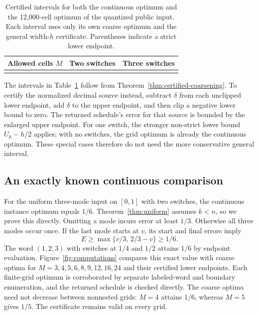 \begin{table}[tb]
\centering\small
\caption{Certified intervals for both the continuous optimum and the
12,000-cell optimum of the quantized public input. Each interval uses only its
own coarse optimum and the general width-$h$ certificate. Parentheses indicate
a strict lower endpoint.}
\label{tab:public-certificates}
\begin{tabular}{@{}rcc@{}}
\toprule
Allowed cells $M$ & Two switches & Three switches\\
\midrule
\\
\bottomrule
\end{tabular}
\end{table}

The intervals in Table~\ref{tab:public-certificates} follow from
Theorem~\ref{thm:certified-coarsening}. To certify the normalized decimal source
instead, subtract $\delta$ from each unclipped lower endpoint, add $\delta$
to the upper endpoint, and then clip a negative lower bound to zero. The
returned schedule's error for that source is bounded by the enlarged upper
endpoint. For one switch, the stronger non-strict lower bound $U_h-h/2$
applies; with no switches, the grid optimum is already the continuous
optimum. These special cases therefore do not need the more conservative
general interval.

\subsection{An exactly known continuous comparison}

For the uniform three-mode input on $[0,1]$ with two switches, the continuous
instance optimum equals $1/6$. Theorem~\ref{thm:uniform} assumes $k<n$, so we
prove this directly. Omitting a mode incurs error at least
$1/3$. Otherwise all three modes occur once. If the last mode starts at $v$,
its start and final errors imply
\[
 E\ge\max\{v/3,\,2/3-v\}\ge1/6.
\]
The word $(1,2,3)$ with switches at $1/4$ and $1/2$ attains $1/6$ by endpoint
evaluation. Figure~\ref{fig:computations} compares this exact value with coarse
optima for $M=3,4,5,6,8,9,12,16,24$ and their certified lower endpoints.
Each finite-grid optimum is corroborated by separate labeled-word and
boundary enumeration, and the returned schedule is checked directly.
The coarse optima need not decrease between nonnested grids: $M=4$ attains
$1/6$, whereas $M=5$ gives $1/5$. The certificate remains valid on every grid.


